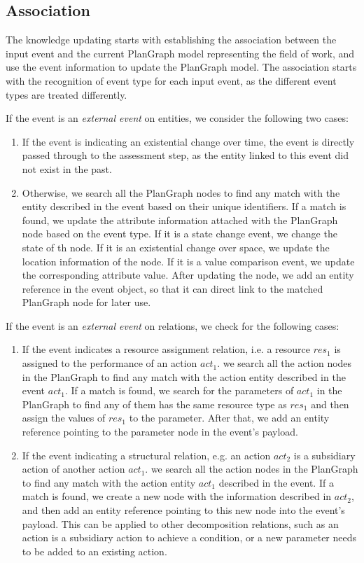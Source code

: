 \subsection{Association} %
\label{sub:association}
The knowledge updating starts with establishing the association between the input event and the current PlanGraph model representing the field of work, and use the event information to update the PlanGraph model. The association starts with the recognition of event type for each input event, as the different event types are treated differently.

If the event is an \emph{external event} on entities, we consider the following two cases:
\begin{enumerate}
	\item If the event is indicating an existential change over time, the event is directly passed through to the assessment step, as the entity linked to this event did not exist in the past.
	\item Otherwise, we search all the PlanGraph nodes to find any match with the entity described in the event based on their unique identifiers. If a match is found, we update the attribute information attached with the PlanGraph node based on the event type. If it is a state change event, we change the state of th node. If it is an existential change over space, we update the location information of the node. If it is a value comparison event, we update the corresponding attribute value. After updating the node, we add an entity reference in the event object, so that it can direct link to the matched PlanGraph node for later use.
\end{enumerate}

If the event is an \emph{external event} on relations, we check for the following cases:
\begin{enumerate}
	\item If the event indicates a resource assignment relation, i.e. a resource $res_1$ is assigned to the performance of an action $act_1$. we search all the action nodes in the PlanGraph to find any match with the action entity described in the event $act_1$. If a match is found, we search for the parameters of $act_1$ in the PlanGraph to find any of them has the same resource type as $res_1$ and then assign the values of $res_1$ to the parameter. After that, we add an entity reference pointing to the parameter node in the event's payload. 
	\item If the event indicating a structural relation, e.g. an action $act_2$ is a subsidiary action of another action $act_1$. we search all the action nodes in the PlanGraph to find any match with the action entity $act_1$ described in the event. If a match is found, we create a new node with the information described in $act_2$, and then add an entity reference pointing to this new node into the event's payload. This can be applied to other decomposition relations, such as an action is a subsidiary action to achieve a condition, or a new parameter needs to be added to an existing action.
\end{enumerate}

